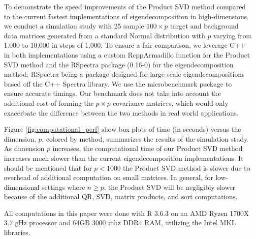 \documentclass[12pt]{article}
\begin{document}
To demonstrate the speed improvements of the Product SVD method compared to the current fastest implementations of eigendecomposition in high-dimensions, we conduct a simulation study with 25 sample $100 \times p$ target and background data matrices generated from a standard Normal distribution with $p$ varying from 1.000 to 10,000 in steps of 1,000. To ensure a fair comparison, we leverage C++ in both implementations using a custom RcppArmadillo \cite{rcpparmadillo} function for the Product SVD method and the RSpectra package (0.16-0) \cite{Rspectra} for the eigendecomposition method; RSpectra being a package designed for large-scale eigendecompositions based off the C++ Spectra library. We use the microbenchmark package \cite{microbenchmark} to ensure accurate timings. Our benchmark does not take into account the additional cost of forming the $p\times p$ covariance matrices, which would only exacerbate the difference between the two methods in real world applications.

Figure \ref{fig:computational_perf} show box plots of time (in seconds) versus the dimension, $p$, colored by method, summarizes the results of the simulation study. As dimension $p$ increases, the computational time of our Product SVD method increases much slower than the current eigendecomposition implementations. It should be mentioned that for $p < 1000$ the Product SVD method is slower due to overhead of additional computation on small matrices. In general, for low-dimensional settings where $n \geq p$, the Product SVD will be negligibly slower because of the additional QR, SVD, matrix products, and sort computations. 


All computations in this paper were done with R 3.6.3 \cite{baseR} on an AMD Ryzen 1700X 3.7 gHz processor and 64GB 3000 mhz DDR4 RAM, utilizing the Intel MKL libraries. 

\end{document}
